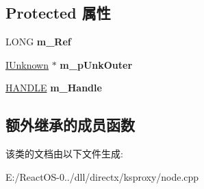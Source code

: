 \subsection*{Protected 属性}
\begin{DoxyCompactItemize}
\item 
\mbox{\label{class_c_ks_node_a48bf49e4947c3a9816a405578f6acbb6}} 
L\+O\+NG {\bfseries m\+\_\+\+Ref}
\item 
\mbox{\label{class_c_ks_node_a50b2d4137ee1b2a99bcec9724e6373a5}} 
\hyperlink{interface_i_unknown}{I\+Unknown} $\ast$ {\bfseries m\+\_\+p\+Unk\+Outer}
\item 
\mbox{\label{class_c_ks_node_a6b394d95a83a58bcff88719a97047654}} 
\hyperlink{interfacevoid}{H\+A\+N\+D\+LE} {\bfseries m\+\_\+\+Handle}
\end{DoxyCompactItemize}
\subsection*{额外继承的成员函数}


该类的文档由以下文件生成\+:\begin{DoxyCompactItemize}
\item 
E\+:/\+React\+O\+S-\/0../dll/directx/ksproxy/node.\+cpp\end{DoxyCompactItemize}
